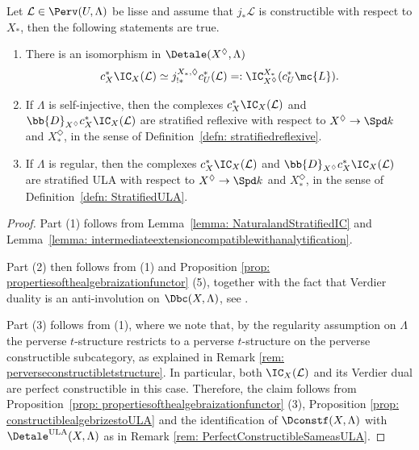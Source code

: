 \documentclass[letterpaper,11pt]{amsart}
\begin{document}
\begin{corollary}{\label{cor: diamonddescriptionoftheICsheaf}}
Let $\mathcal{L}\in \Perv(U,\Lambda)$ be lisse and assume that $j_{*}\mathcal{L}$ is constructible with respect to $X_{*}$, then the following statements are true.
\begin{enumerate}
\item There is an isomorphism in $\Detale(X^{\Diamond},\Lambda)$
\[ c_{X}^{*}\IC_{X}(\mathcal{L}) \simeq j_{!*}^{X_{*},\Diamond}c_{U}^{*}(\mathcal{L})=: \IC_{X^\Diamond}^{X_\ast}(c_U^\ast \mc{L}). \]
\item If $\Lambda$ is self-injective, then the complexes $c_{X}^{*}\IC_{X}(\mathcal{L})$ and $\bb{D}_{X^{\Diamond}}c_{X}^{*}\IC_{X}(\mathcal{L})$ are stratified reflexive with respect to $X^\Diamond\to \Spd k$ and $X_\ast^{\Diamond}$, in the sense of Definition~\ref{defn: stratifiedreflexive}. 
\item If $\Lambda$ is regular, then the complexes $c_{X}^{*}\IC_{X}(\mathcal{L})$ and $\bb{D}_{X^{\Diamond}}c_{X}^{*}\IC_{X}(\mathcal{L})$ are stratified ULA with respect to $X^\Diamond\to \Spd k$ and $X_\ast^{\Diamond}$, in the sense of Definition~\ref{defn: StratifiedULA}. 
\end{enumerate}
\end{corollary}
\begin{proof}
Part (1) follows from Lemma~\ref{lemma: NaturalandStratifiedIC} and Lemma~\ref{lemma: intermediateextensioncompatiblewithanalytification}. 

Part (2) then follows from (1) and Proposition \ref{prop: propertiesofthealgebraizationfunctor} (5), together with the fact that Verdier duality is an anti-involution on $\Dbc(X,\Lambda)$, see \cite[Th\'eor\`eme XVII.6.1.1]{TravauxdeGabberXVII}. 

Part (3) follows from (1), where we note that, by the regularity assumption on $\Lambda$ the perverse $t$-structure restricts to a perverse $t$-structure on the perverse constructible subcategory, as explained in Remark \ref{rem: perverseconstructibletstructure}. In particular, both $\IC_{X}(\mathcal{L})$ and its Verdier dual are perfect constructible in this case. Therefore, the claim follows from Proposition~\ref{prop: propertiesofthealgebraizationfunctor} (3), Proposition \ref{prop: constructiblealgebrizestoULA} and the identification of $\Dconstf(X,\Lambda)$ with $\Detale^\mathrm{ULA}(X,\Lambda)$ as in Remark \ref{rem: PerfectConstructibleSameasULA}. 


\end{proof}
\end{document}
